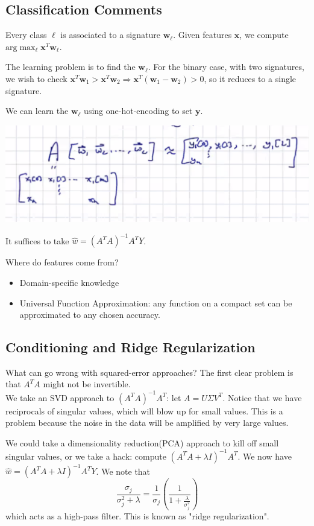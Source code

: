 \documentclass[11pt]{article}
\newcommand{\Vw}{\mathbf{w}}
\newcommand{\Vx}{\mathbf{x}}
\newcommand{\Vy}{\mathbf{y}}
\begin{document}
\subsection{Classification Comments}
\begin{definition} Every class $\ell$ is associated to a signature $\Vw_\ell$.  Given features $\Vx$, we compute $\text{arg}\max_{\ell} \Vx^T \Vw_\ell$.
\end{definition}
The learning problem is to find the $\Vw_\ell$.  For the binary case, with two signatures, we wish to check $\Vx^T \Vw_1 > \Vx^T\Vw_2\Rightarrow \Vx^T(\Vw_1 - \Vw_2) > 0$, so it reduces to a single signature.

We can learn the $\Vw_\ell$ using one-hot-encoding to set $\Vy$.  
\begin{center}
\includegraphics[scale = 0.5]{images/matrixMultiply.png}
\end{center}
It suffices to take $\hat{w} = (A^TA)^{-1}A^TY$.


Where do features come from?
\begin{itemize}
\item Domain-specific knowledge
\item Universal Function Approximation: any function on a compact set can be approximated to any chosen accuracy.
\end{itemize}
\subsection{Conditioning and Ridge Regularization}
What can go wrong with squared-error approaches?  The first clear problem is that $A^TA$ might not be invertible.\\
We take an SVD approach to $(A^TA)^{-1}A^T$: let $A = U\Sigma V^T$. Notice that we have reciprocals of singular values, which will blow up for small values.  This is a problem because the noise in the data will be amplified by very large values. 

 We could take a dimensionality reduction(PCA) approach to kill off small singular values, or we take a hack: compute $(A^TA + \lambda I)^{-1}A^T$.  We now have $\hat{w}  = (A^TA + \lambda I)^{-1}A^T Y$.  We note that 
$$\frac{\sigma_j}{\sigma_j^2 + \lambda} = \frac{1}{\sigma_j}\left (\frac{1}{1 + \frac{\lambda}{\sigma_j^2}}\right)$$
which acts as a high-pass filter.  This is known as "ridge regularization".
\newpage
\end{document}
